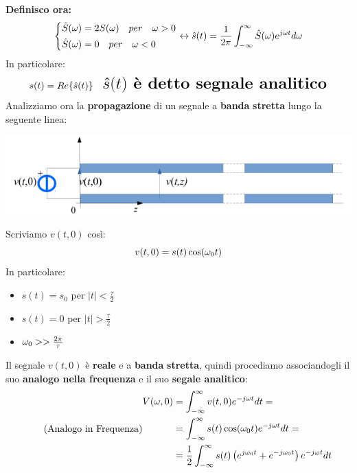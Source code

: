 \textbf{Definisco ora:}
\begin{equation*}
    \begin{dcases}
    \hat{S}(\omega) = 2 S(\omega) \quad per \quad \omega > 0 \\
    \hat{S}(\omega) = 0 \quad per \quad \omega < 0 \\
    \end{dcases}
    \leftrightarrow \hat{s}(t) = \frac{1}{2\pi}\int_{- \infty}^{\infty}  \hat{S}(\omega) e^{j\omega t} d\omega  
\end{equation*}
In particolare:
\begin{equation*}
    s(t) = Re\{\hat{s}(t)\} \quad \textbf{\LARGE $\hat{s} (t)$ è detto segnale analitico}
\end{equation*}
Analizziamo ora la \textbf{propagazione} di un segnale a \textbf{banda} \textbf{stretta} lungo la seguente linea:
\begin{center}
    \includegraphics[width=.8\textwidth]{Images/figure27.png}
\end{center}
Scriviamo $v(t,0)$ così:
\begin{equation*}
    v(t,0) = s(t) \cos(\omega_0 t)
\end{equation*}
In particolare:
\begin{itemize}
    \item $s(t) = s_0$ per $|t| < \frac{\tau}{2}$
     \item $s(t) = 0$ per $|t| > \frac{\tau}{2}$
     \item $\omega_0 >> \frac{2\pi}{\tau}$
\end{itemize}
Il segnale $v(t, 0)$ è \textbf{reale} e a \textbf{banda} \textbf{stretta}, quindi procediamo associandogli il suo \textbf{analogo nella frequenza} e il suo \textbf{segale analitico}:
\begin{equation*}
    \tag{Analogo in Frequenza}
\begin{aligned}
    V(\omega, 0) &= \int_{- \infty}^{\infty} v(t, 0)e^{-j\omega t} dt = \\
    &= \int_{- \infty}^{\infty}s(t) \cos(\omega_0 t)e^{-j\omega t} dt = \\
    &=\frac{1}{2}\int_{- \infty}^{\infty} s(t) \left(e^{j\omega_0 t} + e^{-j\omega_0 t}\right)e^{-j\omega t} dt
\end{aligned}
\end{equation*}

